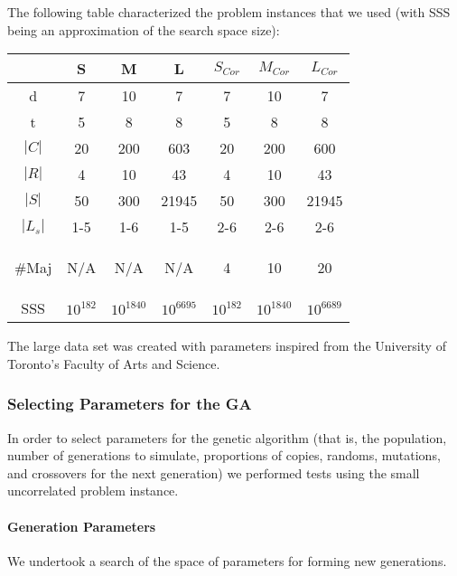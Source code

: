 \documentclass[letterpaper]{article}
\begin{document}
      The following table characterized the problem instances that we used 
      (with \textsc{SSS} being an approximation of the search space size):      
      \begin{center}
      \begin{small}
      \begin{tabular}{*{7}{c}}
      \hline 
      	& S 	& M 	& L 	& $S_{Cor}$ & $M_{Cor}$ & $L_{Cor}$ \\ 
      \hline \hline
       d 		& 7 	& 10	& 7 	& 7 	& 10 	& 7 	\\ 
       t 		& 5		& 8 	& 8 	& 5 	& 8 	& 8 	\\ 
       $|C|$	& 20 	& 200 	& 603 	& 20 	& 200 	& 600 	\\ 
       $|R|$	& 4 	& 10 	& 43 	& 4 	& 10 	& 43	\\ 
       $|S|$	& 50 	& 300 	& 21945 & 50 	& 300 	& 21945	\\ 
       $|L_s|$	& 1-5 	& 1-6 	& 1-5 	& 2-6 	& 2-6 	& 2-6 	\\ 
       \begin{tiny}$\#$Maj\end{tiny}	& N/A 	& N/A 	& N/A 	& 4 	& 10 	& 20 	\\ 
       \textsc{SSS}	& $10^{182}$ & $10^{1840}$ & $10^{6695}$ & $10^{182}$ & $10^{1840}$ & $10^{6689}$ \\
      \hline 
	  \end{tabular} 
	  \end{small}
	  \end{center}
	  
	  The large data set was created with parameters inspired from the University of 
	  Toronto's Faculty of Arts and Science.
	  
    \subsubsection{Selecting Parameters for the GA}
      In order to select parameters for the genetic algorithm (that is, the population, 
      number of generations to simulate, proportions of copies, randoms, mutations, and 
      crossovers for the next generation) we performed tests using the small uncorrelated 
      problem instance.
      
      \paragraph{Generation Parameters}
        We undertook a search of the space of parameters for forming new generations. 
\end{document}
